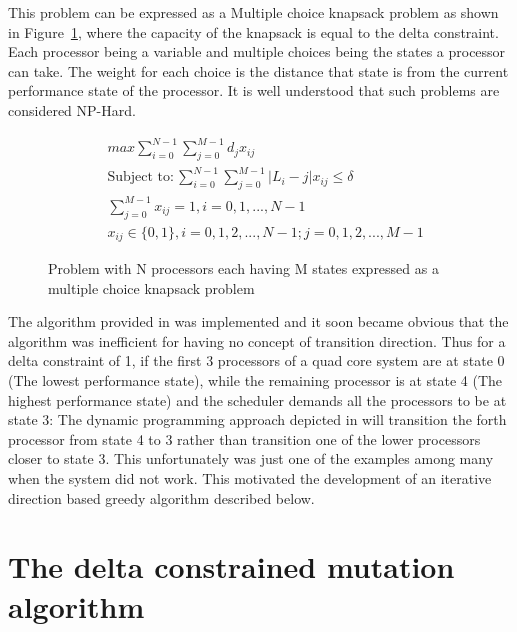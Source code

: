 This problem can be expressed as a Multiple choice knapsack problem as shown in Figure~\ref{fig:mckp}, where the capacity of the knapsack 
is equal to the delta constraint. Each processor being a variable and multiple choices being the states 
a processor can take. The weight for each choice is the distance that state is from the current 
performance state of the processor. It is well understood that such problems are considered NP-Hard.

\begin{figure}[h!]
\centering
\begin{align*}
    & max \displaystyle\sum_{i=0}^{N-1} \displaystyle\sum_{j=0}^{M-1} d_jx_{ij} \\
    & \text{Subject to} : \displaystyle\sum_{i=0}^{N-1} \displaystyle\sum_{j=0}^{M-1} |L_i - j| x_{ij} \leq \delta \\
    & \displaystyle\sum_{j=0}^{M-1} x_{ij} = 1 , i = 0, 1, ..., N-1 \\
    & x_{ij} \in \{0,1\} , i = 0,1,2,...,N-1 ; j = 0,1,2,...,M-1  
\end{align*}
\caption{Problem with N processors each having M states expressed as a multiple choice knapsack problem}
\label{fig:mckp}
\end{figure}

The algorithm provided in \cite{mckp} was implemented and it soon became obvious 
that the algorithm was inefficient for having no concept of transition direction. Thus for 
a delta constraint of 1, if 
the first 3 processors of a quad core system are at state 0 (The lowest performance state),
while the remaining processor is at state 4 (The highest performance state) and the scheduler
demands all the processors to be at state 3: The dynamic programming approach depicted in
\cite{mckp} will transition the forth processor from state 4 to 3 rather than transition 
one of the lower processors closer to state 3. This unfortunately was just one of the examples
among many when the system did not work. This motivated the development of an iterative 
direction based greedy algorithm described below.


\section{The delta constrained mutation algorithm}~\label{sec:delta_algo}

